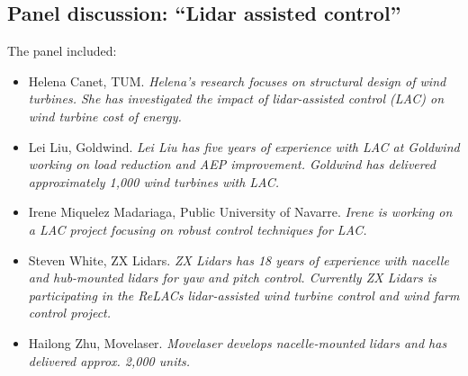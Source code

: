 \subsection{Panel discussion: \enquote{Lidar assisted control}}

The panel included:

\begin{itemize}
    \item Helena Canet, TUM. \textit{Helena’s research focuses on structural design of wind turbines. She has investigated the impact of lidar-assisted control (LAC) on wind turbine cost of energy.}
    \item Lei Liu, Goldwind. \textit{Lei Liu has five years of experience with LAC at Goldwind working on load reduction and AEP improvement. Goldwind has delivered approximately 1,000 wind turbines with LAC.}
    \item Irene Miquelez Madariaga, Public University of Navarre. \textit{Irene is working on a LAC project focusing on robust control techniques for LAC.}
    \item Steven White, ZX Lidars. \textit{ZX Lidars has 18 years of experience with nacelle and hub-mounted lidars for yaw and pitch control. Currently ZX Lidars is participating in the ReLACs lidar-assisted wind turbine control and wind farm control project.}
    \item Hailong Zhu, Movelaser. \textit{Movelaser develops nacelle-mounted lidars and has delivered approx. 2,000 units.}
\end{itemize} 

